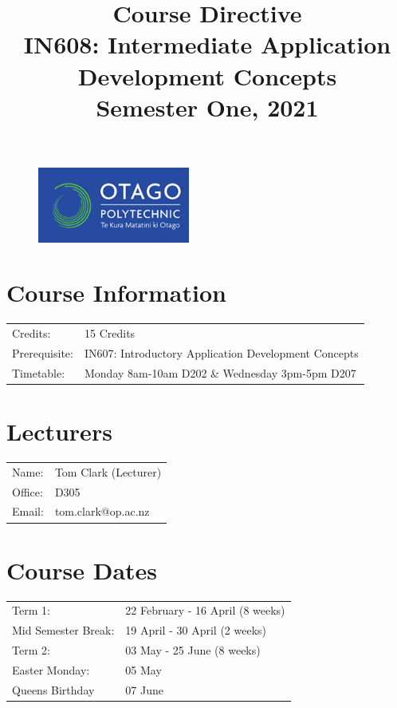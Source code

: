 \documentclass{article}
\author{}
\begin{document}
\begin{figure}
	\includegraphics[width=50mm]{./img/logo.png}
\end{figure}

\title{Course Directive\\IN608: Intermediate Application Development Concepts\\Semester One, 2021}
\date{}
\maketitle

\section*{Course Information}
\begin{tabular}{ll}
	Credits:      & 15 Credits                                           \\
	Prerequisite: & IN607: Introductory Application Development Concepts \\
	Timetable:    & Monday 8am-10am D202 \& Wednesday 3pm-5pm D207       \\
\end{tabular} 

\section*{Lecturers}
\begin{tabular}{ll}
	Name:   & Tom Clark (Lecturer) \\
	Office: & D305                 \\
	Email:  & tom.clark@op.ac.nz   \\
\end{tabular}

\section*{Course Dates}
\begin{tabular}{ll}
	Term 1:             & 22 February - 16 April (8 weeks) \\
	Mid Semester Break: & 19 April - 30 April (2 weeks)    \\
	Term 2:             & 03 May - 25 June (8 weeks)       \\     
	Easter Monday:      & 05 May                           \\ 
	Queens Birthday     & 07 June                          \\          
\end{tabular}
\end{document}
